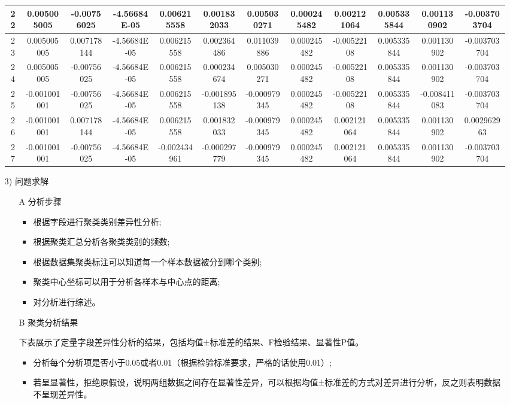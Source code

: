 \documentclass[UTF8]{ctexart}
\begin{document}
\begin{itemize}
\begin{table}[!ht]
{{\begin{tabular}{|c|c|c|c|c|c|c|c|c|c|c|c|}
					      22     & 0.005005005  & -0.00756025 & -4.56684E-05 & 0.006215558  & 0.001832033  & 0.005030271  & 0.000245482   & 0.002121064  & 0.005335844  & 0.001130902  & -0.003703704 \\ \hline
					      23     & 0.005005005  & 0.007178144 & -4.56684E-05 & 0.006215558  & 0.002364486  & 0.011039886  & 0.000245482   & -0.00522108  & 0.005335844  & 0.001130902  & -0.003703704 \\ \hline
					      24     & 0.005005005  & -0.00756025 & -4.56684E-05 & 0.006215558  & 0.000234674  & 0.005030271  & 0.000245482   & -0.00522108  & 0.005335844  & 0.001130902  & -0.003703704 \\ \hline
					      25     & -0.001001001 & -0.00756025 & -4.56684E-05 & 0.006215558  & -0.001895138 & -0.000979345 & 0.000245482   & -0.00522108  & 0.005335844  & -0.008411083 & -0.003703704 \\ \hline
					      26     & -0.001001001 & 0.007178144 & -4.56684E-05 & 0.006215558  & 0.001832033  & -0.000979345 & 0.000245482   & 0.002121064  & 0.005335844  & 0.001130902  & 0.002962963  \\ \hline
					      27     & -0.001001001 & -0.00756025 & -4.56684E-05 & -0.002434961 & -0.000297779 & -0.000979345 & 0.000245482   & 0.002121064  & 0.005335844  & 0.001130902  & -0.003703704 \\ \hline
				      \end{tabular}}}
	      \end{table}



	\item [3)] 问题求解

	      \begin{itemize}
		      \item [A]分析步骤
		            \begin{itemize}
			            \item 根据字段进行聚类类别差异性分析;
			            \item 根据聚类汇总分析各聚类类别的频数;
			            \item 根据数据集聚类标注可以知道每一个样本数据被分到哪个类别;
			            \item 聚类中心坐标可以用于分析各样本与中心点的距离;
			            \item 对分析进行综述。
		            \end{itemize}
		      \item [B]聚类分析结果

		            下表展示了定量字段差异性分析的结果，包括均值±标准差的结果、F检验结果、显著性P值。
		            \begin{itemize}
			            \item 分析每个分析项是否小于0.05或者0.01（根据检验标准要求，严格的话使用0.01）;
			            \item 若呈显著性，拒绝原假设，说明两组数据之间存在显著性差异，可以根据均值±标准差的方式对差异进行分析，反之则表明数据不呈现差异性。
		            \end{itemize}


\end{itemize}
\end{itemize}
\end{document}
